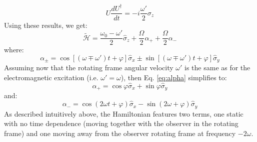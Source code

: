 \documentclass[a4paper,11pt]{article}
\begin{document}
\begin{equation}
    U \frac{dU^{\dagger}}{dt} = -i \frac{\omega'}{2}\sigma_z
\end{equation}
Using these results, we get:
\begin{equation}
    \widetilde{\mathcal{H}} = \frac{\omega_0-\omega'}{2}\hat{\sigma}_z + \frac{\Omega}{2} \alpha_+ + \frac{\Omega}{2} \alpha_-
\end{equation}
where:
\begin{equation}
\label{eq:alpha}
    \alpha_{\pm} = \cos \left[ \left( \omega \mp \omega'  \right)t + \varphi \right] \hat{\sigma}_x \pm \sin \left[ \left( \omega \mp \omega'  \right)t + \varphi \right] \hat{\sigma}_y
\end{equation}
Assuming now that the rotating frame angular velocity $\omega'$ is the same as for the electromagnetic excitation (i.e. $\omega' = \omega$), then Eq. \ref{eq:alpha} simplifies to:
\begin {equation}
\alpha_+ = \cos \varphi \hat{\sigma}_x +  \sin \varphi \hat{\sigma}_y
\end{equation}
and:
\begin{equation}
    \alpha_- = \cos \left( 2 \omega t + \varphi \right) \hat{\sigma}_x - \sin \left( 2\omega + \varphi \right) \hat{\sigma}_y
\end{equation}
As described intuitively above, the Hamiltonian features two terms, one static with no time dependence (moving together with the observer in the rotating frame) and one moving away from the observer rotating frame at frequency $-2 \omega$.
\end{document}
